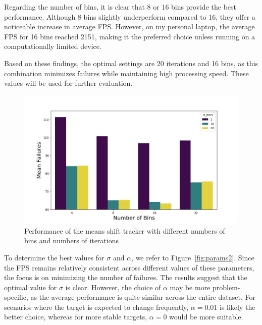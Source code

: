 \documentclass[9pt]{IEEEtran}
\begin{document}
Regarding the number of bins, it is clear that 8 or 16 bins provide the best performance.
 Although 8 bins slightly underperform compared to 16, they offer a noticeable increase
  in average FPS. However, on my personal laptop, the average FPS for 16 bins reached
   2151, making it the preferred choice unless running on a computationally limited
    device.

Based on these findings, the optimal settings are 20 iterations and 16 bins, as 
this combination minimizes failures while maintaining high processing speed. These values 
will be used for further evaluation.

 \begin{figure}[h]
  \centering
  \includegraphics[width=0.99\columnwidth]{figures/nbins_niters.png}
  \caption{Performance of the means shift tracker with different numbers of bins and numbers of
  iterations}
  \label{fig:params1}
\end{figure}

To determine the best values for $\sigma$ and $\alpha$, we refer to Figure~\ref{fig:params2}. 
Since the FPS remains relatively consistent across different values of these parameters, the 
focus is on minimizing the number of failures. The results suggest that the optimal value for
 $\sigma$ is clear. However, the choice of $\alpha$ may be more problem-specific, as the average
  performance is quite similar across the entire dataset. For scenarios where the target is
   expected to change frequently, $\alpha = 0.01$ is likely the better choice, whereas for more
    stable targets, $\alpha = 0$ would be more suitable.
\end{document}
